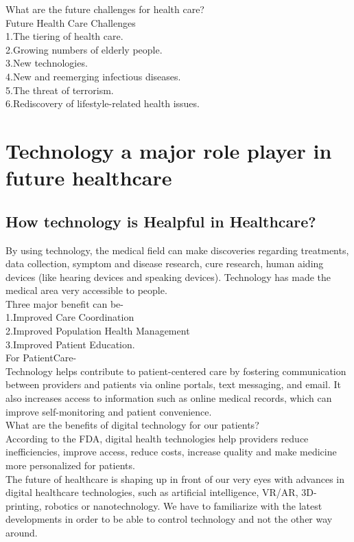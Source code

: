 \documentclass[12pt]{report}
\begin{document}
What are the future challenges for health care?\\
Future Health Care Challenges\\
1.The tiering of health care.\\
2.Growing numbers of elderly people.\\ 
3.New technologies. \\
4.New and reemerging infectious diseases.\\
5.The threat of terrorism.\\
6.Rediscovery of lifestyle-related health issues.\\

\clearpage
\section{Technology a major role player in future healthcare}
\subsection{How technology is Healpful in Healthcare?}
By using technology, the medical field can make discoveries regarding treatments, data collection, symptom and disease research, cure research, human aiding devices (like hearing devices and speaking devices). Technology has made the medical area very accessible to people.\\
Three major benefit can be-\\
1.Improved Care Coordination\\
2.Improved Population Health Management\\
3.Improved Patient Education.\\

For PatientCare-\\
Technology helps contribute to patient-centered care by fostering communication between providers and patients via online portals, text messaging, and email. It also increases access to information such as online medical records, which can improve self-monitoring and patient convenience.\\
What are the benefits of digital technology for our patients?\\
According to the FDA, digital health technologies help providers reduce inefficiencies, improve access, reduce costs, increase quality and make medicine more personalized for patients.\\

The future of healthcare is shaping up in front of our very eyes with advances in digital healthcare technologies, such as artificial intelligence, VR/AR, 3D-printing, robotics or nanotechnology. We have to familiarize with the latest developments in order to be able to control technology and not the other way around.\\
\end{document}
